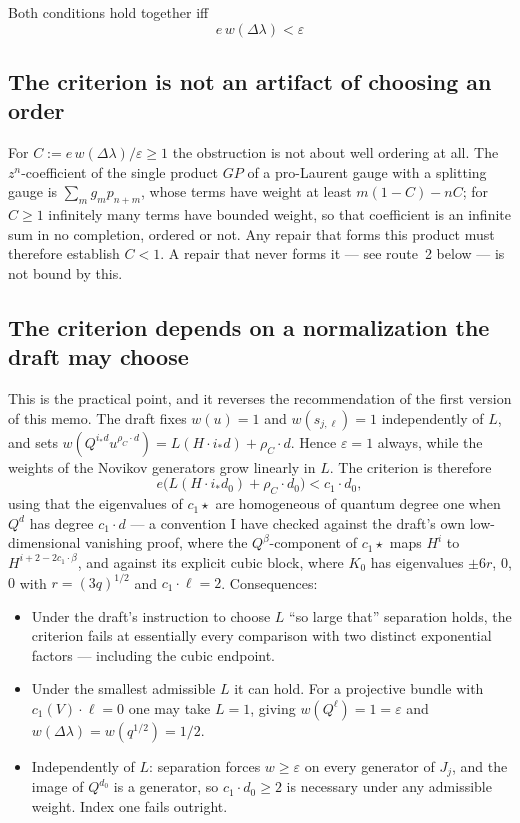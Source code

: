 \documentclass[11pt]{article}
\theoremstyle{definition}
\theoremstyle{remark}
\begin{document}
Both conditions hold together iff
\[
  \boxed{\ e\,w(\Delta\lambda)<\varepsilon\ }
\]

\subsection*{The criterion is not an artifact of choosing an order}

For $C:=e\,w(\Delta\lambda)/\varepsilon\ge1$ the obstruction is not about well
ordering at all. The $z^n$-coefficient of the single product $GP$ of a
pro-Laurent gauge with a splitting gauge is $\sum_mg_mp_{n+m}$, whose terms have
weight at least $m(1-C)-nC$; for $C\ge1$ infinitely many terms have bounded
weight, so that coefficient is an infinite sum in no completion, ordered or not.
Any repair that forms this product must therefore establish $C<1$. A repair that
never forms it --- see route~2 below --- is not bound by this.

\subsection*{The criterion depends on a normalization the draft may choose}

This is the practical point, and it reverses the recommendation of the first
version of this memo. The draft fixes $w(u)=1$ and $w(s_{j,\ell})=1$
independently of $L$, and sets
$w(Q^{i_*d}u^{\rho_C\cdot d})=L(H\cdot i_*d)+\rho_C\cdot d$. Hence
$\varepsilon=1$ always, while the weights of the Novikov generators grow
linearly in $L$. The criterion is therefore
\[
  e\bigl(L(H\cdot i_*d_0)+\rho_C\cdot d_0\bigr)<c_1\cdot d_0,
\]
using that the eigenvalues of $c_1\star$ are homogeneous of quantum degree one
when $Q^d$ has degree $c_1\cdot d$ --- a convention I have checked against the
draft's own low-dimensional vanishing proof, where the $Q^\beta$-component of
$c_1\star$ maps $H^i$ to $H^{i+2-2c_1\cdot\beta}$, and against its explicit
cubic block, where $K_0$ has eigenvalues $\pm6r$, $0$, $0$ with $r=(3q)^{1/2}$
and $c_1\cdot\ell=2$. Consequences:

\begin{itemize}
\item Under the draft's instruction to choose $L$ ``so large that'' separation
  holds, the criterion fails at essentially every comparison with two distinct
  exponential factors --- including the cubic endpoint.
\item Under the smallest admissible $L$ it can hold. For a projective bundle
  with $c_1(V)\cdot\ell=0$ one may take $L=1$, giving $w(Q^\ell)=1=\varepsilon$
  and $w(\Delta\lambda)=w(q^{1/2})=1/2$.
\item Independently of $L$: separation forces $w\ge\varepsilon$ on every
  generator of $J_j$, and the image of $Q^{d_0}$ is a generator, so
  $c_1\cdot d_0\ge2$ is necessary under any admissible weight. Index one fails
  outright.
\end{itemize}
\end{document}
